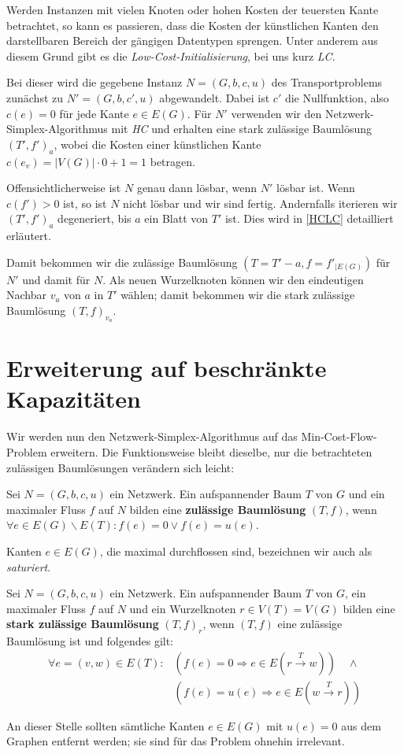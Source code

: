 Werden Instanzen mit vielen Knoten oder hohen Kosten der teuersten Kante betrachtet, so kann es passieren, dass die Kosten der künstlichen Kanten den darstellbaren Bereich der gängigen Datentypen sprengen. Unter anderem aus diesem Grund gibt es die \emph{Low-Cost-Initialisierung}, bei uns kurz \emph{LC}.

Bei dieser wird die gegebene Instanz $N=(G,b,c,u)$ des Transportproblems zunächst zu $N'=(G,b,c',u)$ abgewandelt. Dabei ist $c'$ die Nullfunktion, also $c(e)=0$ für jede Kante $e\in E(G)$. Für $N'$ verwenden wir den Netzwerk-Simplex-Algorithmus mit \emph{HC} und erhalten eine stark zulässige Baumlösung $(T',f')_a$, wobei die Kosten einer künstlichen Kante $c(e_v)=|V(G)|\cdot0+1=1$ betragen.

Offensichtlicherweise ist $N$ genau dann lösbar, wenn $N'$ lösbar ist. Wenn $c(f')>0$ ist, so ist $N$ nicht lösbar und wir sind fertig. Andernfalls iterieren wir $(T',f')_a$ degeneriert, bis $a$ ein Blatt von $T'$ ist. Dies wird in \cref{HCLC} detailliert erläutert.

Damit bekommen wir die zulässige Baumlösung $(T=T'-a, f=f'_{|E(G)})$ für $N'$ und damit für $N$. Als neuen Wurzelknoten können wir den eindeutigen Nachbar $v_a$ von $a$ in $T'$ wählen; damit bekommen wir die stark zulässige Baumlösung $(T,f)_{v_a}$.

\section{Erweiterung auf beschränkte Kapazitäten}\label{ch:alg2}
Wir werden nun den Netzwerk-Simplex-Algorithmus auf das Min-Cost-Flow-Problem erweitern. Die Funktionsweise bleibt dieselbe, nur die betrachteten zulässigen Baumlösungen verändern sich leicht:

\begin{defn}Sei $N=(G,b,c,u)$ ein Netzwerk. Ein aufspannender Baum $T$ von $G$ und ein maximaler Fluss $f$ auf $N$ bilden eine \textbf{zulässige Baumlösung} $(T,f)$, wenn $\forall e\in E(G)\backslash E(T): f(e) = 0\vee f(e)=u(e)$.\end{defn}
\begin{anm}Kanten $e\in E(G)$, die maximal durchflossen sind, bezeichnen wir auch als \emph{saturiert}.\end{anm}

\begin{defn}Sei $N=(G,b,c,u)$ ein Netzwerk. Ein aufspannender Baum $T$ von $G$, ein maximaler Fluss $f$ auf $N$ und ein Wurzelknoten $r\in V(T)=V(G)$ bilden eine \textbf{stark zulässige Baumlösung} $(T,f)_r$, wenn $(T,f)$ eine zulässige Baumlösung ist und folgendes gilt:
\begin{align*}
\forall e=(v,w)\in E(T): &{}(f(e)=0 \Rightarrow e\in E(r\xrightarrow{T}w))\quad\wedge\\
&{}(f(e)=u(e) \Rightarrow e\in E(w\xrightarrow{T}r))
\end{align*}\end{defn}
\begin{anm}An dieser Stelle sollten sämtliche Kanten $e\in E(G)$ mit $u(e)=0$ aus dem Graphen entfernt werden; sie sind für das Problem ohnehin irrelevant.\end{anm}

